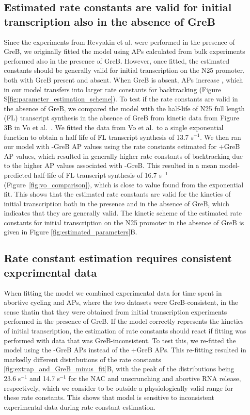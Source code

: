 \subsection{Estimated rate constants are valid for initial transcription also
in the absence of GreB}
Since the experiments from Revyakin et al. were performed in the presence of
GreB, we originally fitted the model using APs calculated from bulk
experiments performed also in the presence of GreB. However, once fitted, the
estimated constants should be generally valid for initial transcription on the
N25 promoter, both with GreB present and absent. When GreB is absent, APs
increase \cite{hsu_initial_2006}, which in our model transfers into larger
rate constants for backtracking (Figure
S\ref{fig:parameter_estimation_scheme}). To test if the rate constants are
valid in the absence of GreB, we compared the model with the half-life of N25
full length (FL) transcript synthesis in the absence of GreB from kinetic data
from Figure 3B in Vo et al.\ \cite{vo_vitro_2003-1}. We fitted the data from Vo et
al.\ to a single exponential function to obtain a half life of FL transcript
synthesis of 13.7 s$^{-1}$. We then ran our model with -GreB AP values using
the rate constants estimated for +GreB AP values, which resulted in generally
higher rate constants of backtracking due to the higher AP values associated
with -GreB. This resulted in a mean model-predicted half-life of FL transcript
synthesis of 16.7 s$^{-1}$ (Figure~\ref{fig:vo_comparison}), which is close to
value found from the exponential fit. This shows that the estimated rate
constants are valid for the kinetics of initial transcription both in the
presence and in the absence of GreB, which indicates that they are generally
valid. The kinetic scheme of the estimated rate constants for initial
transcription on the N25 promoter in the absence of GreB is given in Figure
\ref{fig:estimated_parameters}B.

\subsection{Rate constant estimation requires consistent experimental data}
When fitting the model we combined experimental data for time spent in
abortive cycling and APs, where the two datasets were GreB-consistent, in the
sense thatin that they were obtained from initial transcription experiments
performed in the presence of GreB. If the model correctly represents the
kinetics of initial transcription, the estimation of rate constants should
react if fitting was performed with data that was GreB-inconsistent. To test
this, we re-fitted the model using the -GreB APs instead of the +GreB APs.
This re-fitting resulted in markedly different distributions of the rate
constants \ref{fig:extrap_and_GreB_minus_fit}B, with the peak of the
distributions being 23.6 s$^{-1}$ and 14.7 s$^{-1}$ for the NAC and
unscrunching and abortive RNA release, respectively, which we consider to be
outside a physiologically valid range for these rate constants. This shows
that model is sensitive to inconsistent experimental data during rate constant
estimation.


